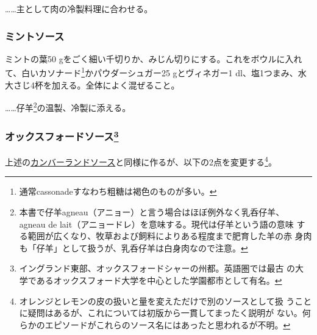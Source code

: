 \begin{recette}
\ldots{}\ldots{}主として肉の冷製料理に合わせる。

\hypertarget{mint-sauce}{%
\subsubsection{ミントソース}\label{mint-sauce}}



ミントの葉50
gをごく細い千切りか、みじん切りにする。これをボウルに入れて、白いカソナード\footnote{通常cassonadeすなわち粗糖は褐色のものが多い。}かパウダーシュガー25
gとヴィネガー1\undemi{}
dl、塩1つまみ、水大さじ4杯を加える。全体によく混ぜること。

\ldots{}\ldots{}仔羊\footnote{本書で仔羊agneau（アニョー）と言う場合はほぼ例外なく乳呑仔羊、
  agneau de lait（アニョードレ）を意味する。現代は仔羊という語の意味
  する範囲が広くなり、牧草および飼料によりある程度まで肥育した羊の赤
  身肉も「仔羊」として扱うが、乳呑仔羊は白身肉なので注意。}の温製、冷製に添える。

\hypertarget{oxford-sauce}{%
\subsubsection[オックスフォードソース]{\texorpdfstring{オックスフォードソース\footnote{イングランド東部、オックスフォードシャーの州都。英語圏では最古
  の大学であるオックスフォード大学を中心とした学園都市として有名。}}{オックスフォードソース}}\label{oxford-sauce}}


上述の\protect\hyperlink{cumberland-sauce}{カンバーランドソース}と同様に作るが、以下の2点を変更する\footnote{オレンジとレモンの皮の扱いと量を変えただけで別のソースとして扱
  うことに疑問はあるが、これについては初版から一貫してまったく説明が
  ない。何らかのエピソードがこれらのソース名にはあったと思われるが不明。}。


\end{recette}
